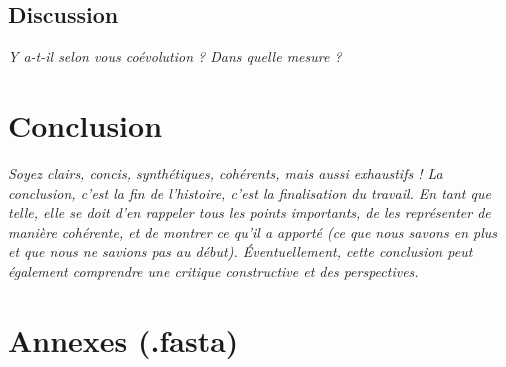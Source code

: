 \documentclass[a4paper, 12pt]{article}
\begin{document}
\subsection{Discussion}
\emph{Y a-t-il selon vous coévolution ? Dans quelle mesure ?}
\section{Conclusion}
\emph{Soyez clairs, concis, synthétiques, cohérents, mais aussi exhaustifs ! La conclusion, c’est la fin de l’histoire, c’est la finalisation du travail. En tant que telle, elle se doit d’en rappeler tous les points importants, de les représenter de manière cohérente, et de montrer ce qu’il a apporté (ce que nous savons en plus et que nous ne savions pas au début). Éventuellement, cette conclusion peut également comprendre une critique constructive et des perspectives.}

\printbibliography

\section{Annexes (.fasta)}
\end{document}
